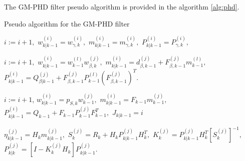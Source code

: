 The GM-PHD filter pseudo algorithm is provided in the algorithm \ref{alg:phd}.
\begin{algorithm}[h]
    \caption{Pseudo algorithm for the GM-PHD filter}
    \begin{algorithmic}[1]

        \State
            \State $i:= i+1,$
            \State $w_{k|k-1}^{(i)} = w_{\gamma,k}^{(i)},$ \quad
            $m_{k|k-1}^{(i)} = m_{\gamma,k}^{(i)},$ \quad
            $P_{k|k-1}^{(i)} = P_{\gamma,k}^{(i)},$
        \EndFor

                \State $i:=i+1,$
                \State $w_{k|k-1}^{(i)} = w_{k-1}^{(l)} w_{\beta,k}^{(j)},$
                \State $m_{k|k-1}^{(i)} = d_{\beta,k-1}^{(j)} + F_{\beta,k-1}^{(j)} m_{k-1}^{(l)},$
                \State $P_{k|k-1}^{(i)} = Q_{\beta|k-1}^{(j)} + F_{\beta,k-1}^{(j)} P_{k-1}^{(l)} (F_{\beta,k-1}^{(j)})^T.$
            \EndFor
        \EndFor
        \EndProcedure
        \State


            \State $i:=i+1$,
            \State $w_{k|k-1}^{(i)} = p_{S,k} w_{k-1}^{(j)},$
            \State $m_{k|k-1}^{(i)} = F_{k-1} m_{k-1}^{(j)},$
            \State $P_{k|k-1}^{(i)} = Q_{k-1} + F_{k-1} P_{k-1}^{(j)} F_{k-1}^T,$
        \EndFor
        \State $J_{k|k-1} = i$
        \EndProcedure

        \State
            \State $\eta_{k|k-1}^{(j)} = H_k m_{k|k-1}^{(j)},$ \quad
             $S_k^{(j)} = R_k + H_k P_{k|k-1}^{(j)} H_k^T,$
            \State $K_k^{(j)} = P_{k|k-1}^{(j)} H_k^T [S_k^{(j)}]^{-1},$ \quad
             $P_{k|k}^{(j)} = [I - K_k^{(j)} H_k] P_{k|k-1}^{(j)}.$
        \EndFor
        \EndProcedure


\end{algorithmic}
\end{algorithm}
